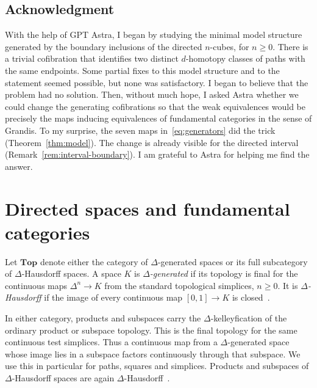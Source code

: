 \documentclass[12pt,a4paper]{amsart}
\theoremstyle{definition}
\renewcommand{\geq}{\geqslant}
\begin{document}
\subsection*{Acknowledgment}
With the help of GPT Astra, I began by studying the minimal model structure generated by the boundary inclusions of the directed $n$-cubes, for $n\geq 0$. There is a trivial cofibration that identifies two distinct $d$-homotopy classes of paths with the same endpoints. Some partial fixes to this model structure and to the statement seemed possible, but none was satisfactory. I began to believe that the problem had no solution. Then, without much hope, I asked Astra whether we could change the generating cofibrations so that the weak equivalences would be precisely the maps inducing equivalences of fundamental categories in the sense of Grandis. To my surprise, the seven maps in~\eqref{eq:generators} did the trick (Theorem~\ref{thm:model}). The change is already visible for the directed interval (Remark~\ref{rem:interval-boundary}). I am grateful to Astra for helping me find the answer.

\section{Directed spaces and fundamental categories}\label{sec:setting}

Let $\mathbf{Top}$ denote either the category of $\Delta$-generated spaces or its full subcategory of $\Delta$-Hausdorff spaces. A space $K$ is \emph{$\Delta$-generated} if its topology is final for the continuous maps $\Delta^n\to K$ from the standard topological simplices, $n\geq0$. It is \emph{$\Delta$-Hausdorff} if the image of every continuous map $[0,1]\to K$ is closed~\cite[Definition~B.1]{leftproperflow}.

In either category, products and subspaces carry the $\Delta$-kelleyfication of the ordinary product or subspace topology. This is the final topology for the same continuous test simplices. Thus a continuous map from a $\Delta$-generated space whose image lies in a subspace factors continuously through that subspace. We use this in particular for paths, squares and simplices. Products and subspaces of $\Delta$-Hausdorff spaces are again $\Delta$-Hausdorff~\cite[Propositions~B.4 and~B.5]{leftproperflow}.
\end{document}
